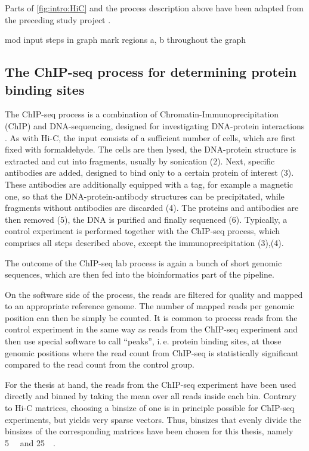 Parts of \cref{fig:intro:HiC} and the process description above 
have been adapted from the preceding study project \cite{Krauth2020}.



\xxx mod input steps in graph
\xxx mark regions a, b throughout the graph

\subsection{The ChIP-seq process for determining protein binding sites} \label{sec:intro:chipseq}
The ChIP-seq process is a combination of Chromatin-Immunoprecipitation (ChIP) and DNA-sequencing, 
designed for investigating DNA-protein interactions \cite{Johnson2007,Robertson2007}.
As with Hi-C, the input consists of a sufficient number of cells, which are first fixed with formaldehyde.
The cells are then lysed, the DNA-protein structure is extracted and cut into fragments, 
usually by sonication (2).
Next, specific antibodies are added, designed to bind only to a certain protein of interest (3).
These antibodies are additionally equipped with a tag, for example a magnetic one, so that 
the DNA-protein-antibody structures can be precipitated, while fragments without antibodies are discarded (4).
The proteins and antibodies are then removed (5), 
the DNA is purified and finally sequenced (6).
Typically, a control experiment is performed together with the ChIP-seq process, 
which comprises all steps described above, except the immunoprecipitation (3),(4).

The outcome of the ChIP-seq lab process is again a bunch of short genomic sequences, 
which are then fed into the bioinformatics part of the pipeline.

On the software side of the process, the reads are filtered for quality and mapped to an appropriate reference genome.
The number of mapped reads per genomic position can then be simply be counted.
It is common to process reads from the control experiment in the same way as reads from the ChIP-seq experiment
and then use special software to call ``peaks'', i.\,e. protein binding sites,
at those genomic positions where the read count from ChIP-seq
is statistically significant compared to the read count from the control group.

For the thesis at hand, the reads from the ChIP-seq experiment have been used directly
and binned by taking the mean over all reads inside each bin.
Contrary to Hi-C matrices, choosing a binsize of one is in principle possible for ChIP-seq experiments, but yields very sparse vectors.
Thus, binsizes that evenly divide the binsizes of the corresponding matrices have been chosen for this thesis, namely \SI{5}{\kilo\bp} and \SI{25}{\kilo\bp}.

